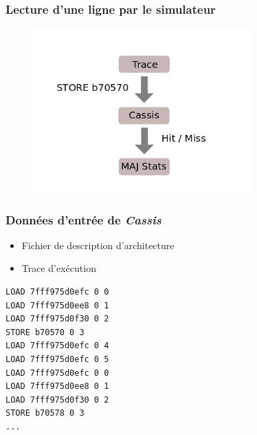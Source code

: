 \begin{frame}
  \frametitle{Lecture d'une ligne par le simulateur}
  
  \begin{figure}[h!]
    \includegraphics[width=0.75\textwidth]{images/cassis_deroulement.png}
  \end{figure}
  
\end{frame}

\begin{frame}[fragile]
  \frametitle{Données d'entrée de \emph{Cassis}}
  
  
  \begin{itemize}
    \item{Fichier de description d'architecture}
    \item{Trace d'exécution}
  \end{itemize}
  
\begin{verbatim}
LOAD 7fff975d0efc 0 0
LOAD 7fff975d0ee8 0 1
LOAD 7fff975d0f30 0 2
STORE b70570 0 3
LOAD 7fff975d0efc 0 4
LOAD 7fff975d0efc 0 5
LOAD 7fff975d0efc 0 0
LOAD 7fff975d0ee8 0 1
LOAD 7fff975d0f30 0 2
STORE b70578 0 3
...
\end{verbatim}

\end{frame}

